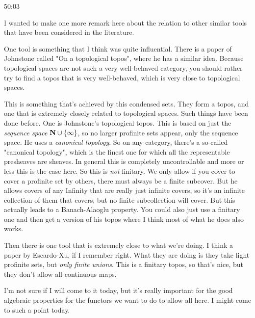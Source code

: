\begin{unfinished}{50:03}
\begin{remark}
I wanted to make one more remark here about the relation to other similar tools that have been considered in the literature.

One tool is something that I think was quite influential. There is a paper of Johnstone called "On a topological topos", \citeme{} where he has a similar idea. Because topological spaces are not such a very well-behaved category, you should rather try to find a topos that is very well-behaved, which is very close to topological spaces.


This is something that's achieved by this condensed sets. They form a topos, and one that is extremely closely related to topological spaces. Such things have been done before. One is Johnstone's topological topos. This is based on just the \emph{sequence space} $\mathbf N \cup \{\infty\}$, so no larger profinite sets appear, only the sequence space.
He uses a \emph{canonical topology}. So on any category, there's a so-called "canonical topology", which is the finest one for which all the representable presheaves are sheaves. %
In general this is completely uncontrollable and more or less this is the case here. So this is \emph{not} finitary. We only allow if you cover to cover a  profinite set by others, there must always be a finite subcover. But he allows covers of any 
Infinity that are really just infinite covers, so it's an infinite collection of them that covers, but no finite subcollection will cover. But this actually leads to a Banach-Alaoglu property.
You could also just use a finitary one and then get a version of his topos where I think most of what he does also works. 

Then there is one tool that is extremely close to what we're doing. I think a paper by Escardo-Xu, if I remember right. What they are doing is they take light profinite sets, but \emph{only finite unions}. This is a finitary topos, so that's nice, but they don't allow all continuous maps.

I'm not sure if I will come to it today, but it's really important for the good algebraic properties for the functors we want to do to allow all here. I might come to such a point today.


\end{remark}
\end{unfinished}
